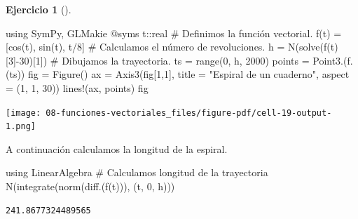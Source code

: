 \documentclass[
  a4paper,
]{scrreport}
\newenvironment{Shaded}{\begin{snugshade}}{\end{snugshade}}
\newcommand{\BuiltInTok}[1]{\textcolor[rgb]{0.00,0.23,0.31}{#1}}
\newcommand{\CommentTok}[1]{\textcolor[rgb]{0.37,0.37,0.37}{#1}}
\newcommand{\DataTypeTok}[1]{\textcolor[rgb]{0.68,0.00,0.00}{#1}}
\newcommand{\FloatTok}[1]{\textcolor[rgb]{0.68,0.00,0.00}{#1}}
\newcommand{\FunctionTok}[1]{\textcolor[rgb]{0.28,0.35,0.67}{#1}}
\newcommand{\ImportTok}[1]{\textcolor[rgb]{0.00,0.46,0.62}{#1}}
\newcommand{\NormalTok}[1]{\textcolor[rgb]{0.00,0.23,0.31}{#1}}
\newcommand{\OperatorTok}[1]{\textcolor[rgb]{0.37,0.37,0.37}{#1}}
\newcommand{\PreprocessorTok}[1]{\textcolor[rgb]{0.68,0.00,0.00}{#1}}
\newcommand{\StringTok}[1]{\textcolor[rgb]{0.13,0.47,0.30}{#1}}
\theoremstyle{definition}
\newtheorem{exercise}{Ejercicio}[chapter]
\theoremstyle{remark}
\begin{document}
\begin{exercise}[]
\begin{tcolorbox}
\begin{Shaded}
\begin{Highlighting}[]
\ImportTok{using} \BuiltInTok{SymPy}\NormalTok{, }\BuiltInTok{GLMakie}
\PreprocessorTok{@syms}\NormalTok{ t}\OperatorTok{::}\DataTypeTok{real}
\CommentTok{\# Definimos la función vectorial.}
\FunctionTok{f}\NormalTok{(t) }\OperatorTok{=}\NormalTok{ [}\FunctionTok{cos}\NormalTok{(t), }\FunctionTok{sin}\NormalTok{(t), t}\OperatorTok{/}\FloatTok{8}\NormalTok{]}
\CommentTok{\# Calculamos el número de revoluciones.}
\NormalTok{h }\OperatorTok{=} \FunctionTok{N}\NormalTok{(}\FunctionTok{solve}\NormalTok{(}\FunctionTok{f}\NormalTok{(t)[}\FloatTok{3}\NormalTok{]}\OperatorTok{{-}}\FloatTok{30}\NormalTok{)[}\FloatTok{1}\NormalTok{])}
\CommentTok{\# Dibujamos la trayectoria.}
\NormalTok{ts }\OperatorTok{=} \FunctionTok{range}\NormalTok{(}\FloatTok{0}\NormalTok{, h, }\FloatTok{2000}\NormalTok{)}
\NormalTok{points }\OperatorTok{=} \FunctionTok{Point3}\NormalTok{.(}\FunctionTok{f}\NormalTok{.(ts))}
\NormalTok{fig }\OperatorTok{=} \FunctionTok{Figure}\NormalTok{()}
\NormalTok{ax }\OperatorTok{=} \FunctionTok{Axis3}\NormalTok{(fig[}\FloatTok{1}\NormalTok{,}\FloatTok{1}\NormalTok{], title }\OperatorTok{=} \StringTok{"Espiral de un cuaderno"}\NormalTok{, aspect }\OperatorTok{=}\NormalTok{ (}\FloatTok{1}\NormalTok{, }\FloatTok{1}\NormalTok{, }\FloatTok{30}\NormalTok{))}
\FunctionTok{lines!}\NormalTok{(ax, points)}
\NormalTok{fig}
\end{Highlighting}
\end{Shaded}

\texttt{[image: 08-funciones-vectoriales\_files/figure-pdf/cell-19-output-1.png]}

A continuación calculamos la longitud de la espiral.

\begin{Shaded}
\begin{Highlighting}[]
\ImportTok{using} \BuiltInTok{LinearAlgebra}
\CommentTok{\# Calculamos longitud de la trayectoria}
\FunctionTok{N}\NormalTok{(}\FunctionTok{integrate}\NormalTok{(}\FunctionTok{norm}\NormalTok{(}\FunctionTok{diff}\NormalTok{.(}\FunctionTok{f}\NormalTok{(t))), (t, }\FloatTok{0}\NormalTok{, h)))}
\end{Highlighting}
\end{Shaded}

\begin{verbatim}
241.8677324489565
\end{verbatim}

\end{tcolorbox}

\end{exercise}
\end{document}
